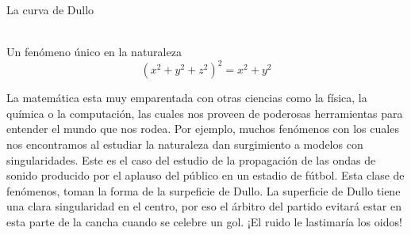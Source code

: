 \documentclass[es]{SurferDesc}%
\begin{document}
\footnotesize


\begin{surferPage}
  \begin{surferTitle}La curva de Dullo\end{surferTitle}  
  \\
Un fenómeno único en la naturaleza\\
\smallskip
\[(x^2+ y^2+ z^2)^2	= x^2+ y^2\]

\singlespacing
La matemática esta muy emparentada con otras ciencias como la física, la química o la computación, las cuales nos proveen de poderosas herramientas para entender el mundo que nos rodea. 
\singlespacing
Por ejemplo, muchos fenómenos con los cuales nos encontramos al estudiar la naturaleza dan surgimiento a modelos con singularidades.
\singlespacing
Este es el caso del estudio de la propagación de las ondas de sonido producido por el aplauso del público en un estadio de fútbol. Esta clase de fenómenos, toman la forma de la surpeficie de Dullo. La superficie de Dullo tiene una clara singularidad en el centro, por eso el árbitro del partido evitará estar en esta parte de la cancha cuando se celebre un gol. ¡El ruido le lastimaría los oidos!


  \begin{surferText}
     \end{surferText}
\end{surferPage}
\end{document}

